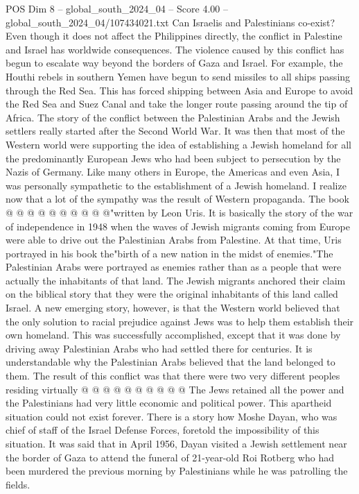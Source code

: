 \begin{textsample}{POS Dim 8 – global\_south\_2024\_04 – Score 4.00 – global\_south\_2024\_04/107434021.txt}  \label{ex:f8_pos_413}
Can Israelis and Palestinians co-exist?
Even though it does not affect the Philippines directly, the conflict in Palestine and Israel has worldwide consequences.
The violence caused by this conflict has begun to escalate way beyond the borders of Gaza and Israel.
For example, the Houthi rebels in southern Yemen have begun to send missiles to all ships passing through the Red Sea.
This has forced shipping between Asia and Europe to avoid the Red Sea and Suez Canal and take the longer route passing around the tip of Africa.
The story of the conflict between the Palestinian Arabs and the Jewish settlers really started after the Second World War.
It was then that most of the Western world were supporting the idea of establishing a Jewish homeland for all the predominantly European Jews who had been subject to persecution by the Nazis of Germany.
Like many others in Europe, the Americas and even Asia, I was personally sympathetic to the establishment of a Jewish homeland.
I realize now that a lot of the sympathy was the result of Western propaganda.
The book @ @ @ @ @ @ @ @ @ @"written by Leon Uris.
It is basically the story of the war of independence in 1948 when the waves of Jewish migrants coming from Europe were able to drive out the Palestinian Arabs from Palestine.
At that time, Uris portrayed in his book the"birth of a new nation in the midst of enemies."The Palestinian Arabs were portrayed as enemies rather than as a people that were actually the inhabitants of that land.
The Jewish migrants anchored their claim on the biblical story that they were the original inhabitants of this land called Israel.
A new emerging story, however, is that the Western world believed that the only solution to racial prejudice against Jews was to help them establish their own homeland.
This was successfully accomplished, except that it was done by driving away Palestinian Arabs who had settled there for centuries.
It is understandable why the Palestinian Arabs believed that the land belonged to them.
The result of this conflict was that there were two very different peoples residing virtually @ @ @ @ @ @ @ @ @ @ The Jews retained all the power and the Palestinians had very little economic and political power.
This apartheid situation could not exist forever.
There is a story how Moshe Dayan, who was chief of staff of the Israel Defense Forces, foretold the impossibility of this situation.
It was said that in April 1956, Dayan visited a Jewish settlement near the border of Gaza to attend the funeral of 21-year-old Roi Rotberg who had been murdered the previous morning by Palestinians while he was patrolling the fields.

\end{textsample}

